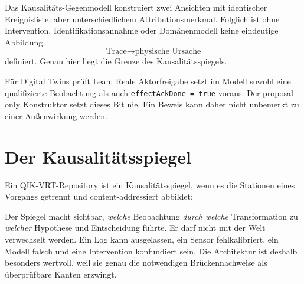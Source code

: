\documentclass[11pt,a4paper,oneside]{article}
\newcommand{\code}[1]{\texttt{#1}}
\begin{document}
Das Kausalitäts-Gegenmodell konstruiert zwei Ansichten mit identischer
Ereignisliste, aber unterschiedlichem Attributionsmerkmal. Folglich ist ohne
Intervention, Identifikationsannahme oder Domänenmodell keine eindeutige
Abbildung
\[
  \text{Trace} \longrightarrow \text{physische Ursache}
\]
definiert. Genau hier liegt die Grenze des Kausalitätsspiegels.

Für Digital Twins prüft Lean: Reale Aktorfreigabe setzt im Modell sowohl eine
qualifizierte Beobachtung als auch \code{effectAckDone = true} voraus. Der
proposal-only Konstruktor setzt dieses Bit nie. Ein Beweis kann daher nicht
unbemerkt zu einer Außenwirkung werden.

\section{Der Kausalitätsspiegel}

Ein QIK-VRT-Repository ist ein Kausalitätsspiegel, wenn es die Stationen eines
Vorgangs getrennt und content-addressiert abbildet:

\begin{center}
\end{center}

Der Spiegel macht sichtbar, \emph{welche} Beobachtung \emph{durch welche}
Transformation zu \emph{welcher} Hypothese und Entscheidung führte. Er darf
nicht mit der Welt verwechselt werden. Ein Log kann ausgelassen, ein Sensor
fehlkalibriert, ein Modell falsch und eine Intervention konfundiert sein. Die
Architektur ist deshalb besonders wertvoll, weil sie genau die notwendigen
Brückennachweise als überprüfbare Kanten erzwingt.
\end{document}
